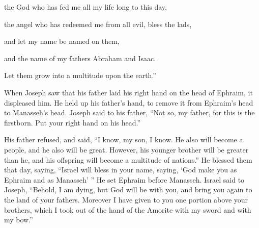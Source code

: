 the God who has fed me all my life long to this day,

\myverse{}the angel who has redeemed me from all evil, bless the lads,

and let my name be named on them,

and the name of my fathers Abraham and Isaac.

Let them grow into a multitude upon the earth.”

\myverse{}When Joseph saw that his father laid his right hand on the head of Ephraim, it displeased him. He held up his father’s hand, to remove it from Ephraim’s head to Manasseh’s head. \myverse{}Joseph said to his father, “Not so, my father, for this is the firstborn. Put your right hand on his head.”

\myverse{}His father refused, and said, “I know, my son, I know. He also will become a people, and he also will be great. However, his younger brother will be greater than he, and his offspring will become a multitude of nations.” \myverse{}He blessed them that day, saying, “Israel will bless in your name, saying, ‘God make you as Ephraim and as Manasseh’ ” He set Ephraim before Manasseh. \myverse{}Israel said to Joseph, “Behold, I am dying, but God will be with you, and bring you again to the land of your fathers. \myverse{}Moreover I have given to you one portion above your brothers, which I took out of the hand of the Amorite with my sword and with my bow.”

